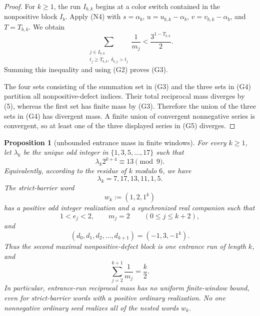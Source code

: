 \documentclass[11pt]{article}
\newtheorem{proposition}[theorem]{Proposition}
\begin{document}
\begin{proof}
For $k\geq1$, the run $I_{b,k}$ begins at a color switch contained in the
nonpositive block $I_b$.  Apply (N4) with $s=\alpha_b$, $u=u_{b,k}-\alpha_b$,
$v=v_{b,k}-\alpha_b$, and $T=T_{b,k}$.  We obtain
\[
  \sum_{\substack{j\in I_{b,k}\\
                   t_j\geq T_{b,k},\ \delta_{b,j}>t_j}}
  \frac1{m_j}
  <\frac{3^{1-T_{b,k}}}{2}.
\]
Summing this inequality and using (G2) proves (G3).

The four sets consisting of the summation set in (G3) and the three sets
in (G4) partition all nonpositive-defect indices.  Their total reciprocal
mass diverges by (5), whereas the first set has finite mass by (G3).
Therefore the union of the three sets in (G4) has divergent mass.  A finite
union of convergent nonnegative series is convergent, so at least one of
the three displayed series in (G5) diverges.
\end{proof}

\begin{proposition}[unbounded entrance mass in finite windows]
For every $k\geq1$, let $\lambda_k$ be the unique odd integer in
$\{1,3,5,\ldots,17\}$ such that
\[
  \lambda_k2^{k+4}\equiv13\pmod9.
  \tag{E1}
\]
Equivalently, according to the residue of $k$ modulo $6$, we have
\[
  \lambda_k=7,17,13,11,1,5.
  \tag{E2}
\]
The strict-barrier word
\[
  w_k:=(1,2,1^k)
  \tag{E3}
\]
has a positive odd integer realization and a synchronized real companion
such that
\[
  1<e_j<2,
  \qquad
  m_j=2
  \qquad(0\leq j\leq k+2),
  \tag{E4}
\]
and
\[
  (d_0,d_1,d_2,\ldots,d_{k+1})=(-1,3,-1^k).
  \tag{E5}
\]
Thus the second maximal nonpositive-defect block is one entrance run of
length $k$, and
\[
\boxed{
  \sum_{j=2}^{k+1}\frac1{m_j}=\frac{k}{2}.}
\tag{E6}
\]
In particular, entrance-run reciprocal mass has no uniform finite-window
bound, even for strict-barrier words with a positive ordinary realization.
No one nonnegative ordinary seed realizes all of the nested words $w_k$.
\end{proposition}
\end{document}
